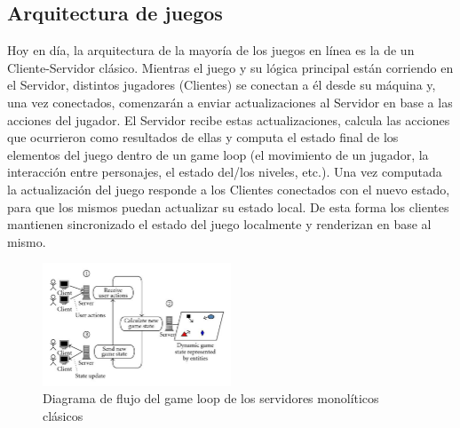 \subsection{Arquitectura de juegos}
Hoy en día, la arquitectura de la mayoría de los juegos en línea es la de un Cliente-Servidor clásico. 
Mientras el juego y su lógica principal están corriendo en el Servidor, distintos jugadores (Clientes) 
se conectan a él desde su máquina y, una vez conectados, comenzarán a enviar actualizaciones al 
Servidor en base a las acciones del jugador. El Servidor recibe estas actualizaciones, 
calcula las acciones que ocurrieron como resultados de ellas y computa el estado final de los 
elementos del juego dentro de un game loop (el movimiento de un jugador, la interacción entre 
personajes, el estado del/los niveles, etc.). Una vez computada la actualización del juego 
responde a los Clientes conectados con el nuevo estado, para que los mismos puedan actualizar 
su estado local. De esta forma los clientes mantienen sincronizado el estado del juego localmente 
y renderizan en base al mismo.

\begin{figure}[htbp]
    \centering
    \includegraphics[width=0.5\textwidth]{../assets/monolith-server-game-loop.png}
    \caption{Diagrama de flujo del game loop de los servidores monolíticos clásicos}
\end{figure}
